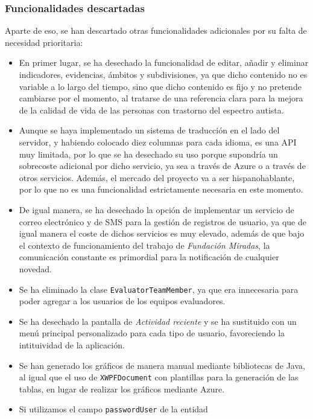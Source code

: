 \subsubsection{Funcionalidades descartadas}
Aparte de eso, se han descartado otras funcionalidades adicionales por su falta de necesidad prioritaria:
\begin{itemize}
    \item En primer lugar, se ha desechado la funcionalidad de editar, añadir y
    eliminar indicadores, evidencias, ámbitos y subdivisiones, ya que dicho
    contenido no es variable a lo largo del tiempo, sino que dicho contenido es
    fijo y no pretende cambiarse por el momento, al tratarse de una referencia
    clara para la mejora de la calidad de vida de las personas con trastorno del
    espectro autista.
    \item Aunque se haya implementado un sistema de traducción en el lado del
    servidor, y habiendo colocado diez columnas para cada idioma, es una API muy
    limitada, por lo que se ha desechado su uso porque supondría un sobrecoste
    adicional por dicho servicio, ya sea a través de Azure o a través de otros
    servicios. Además, el mercado del proyecto va a ser hispanohablante, por lo
    que no es una funcionalidad estrictamente necesaria en este momento.
    \item De igual manera, se ha desechado la opción de implementar un servicio
    de correo electrónico y de SMS para la gestión de registros de usuario, ya
    que de igual manera el coste de dichos servicios es muy elevado, además de
    que bajo el contexto de funcionamiento del trabajo de \textit{Fundación
    Miradas}, la comunicación constante es primordial para la notificación de
    cualquier novedad.
    \item Se ha eliminado la clase \texttt{EvaluatorTeamMember}, ya que era
    innecesaria para poder agregar a los usuarios de los equipos evaluadores.
    \item Se ha desechado la pantalla de \textit{Actividad reciente} y se ha
    sustituido con un menú principal personalizado para cada tipo de usuario,
    favoreciendo la intituividad de la aplicación.
    \item Se han generado los gráficos de manera manual mediante bibliotecas de
    Java, al igual que el uso de \texttt{XWPFDocument} con plantillas para la
    generación de las tablas, en lugar de realizar los gráficos mediante Azure.
    \item Si utilizamos el campo \texttt{passwordUser} de la entidad

\end{itemize}
